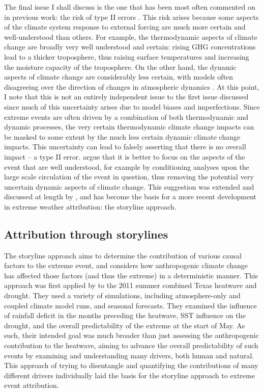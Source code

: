     The final issue I shall discuss is the one that has been most often commented on in previous work: the risk of type II errors \citep{shepherd_common_2016,trenberth_attribution_2015}. This risk arises because some aspects of the climate system response to external forcing are much more certain and well-understood than others. For example, the thermodynamic aspects of climate change are broadly very well understood and certain: rising GHG concentrations lead to a thicker troposphere, thus raising surface temperatures and increasing the moisture capacity of the troposphere. On the other hand, the dynamic aspects of climate change are considerably less certain, with models often disagreeing over the direction of changes in atmospheric dynamics \citep{masato_winter_2013}. At this point, I note that this is not an entirely independent issue to the first issue discussed since much of this uncertainty arises due to model biases and imperfections. Since extreme events are often driven by a combination of both thermodynamic and dynamic processes, the very certain thermodynamic climate change impacts can be masked to some extent by the much less certain dynamic climate change impacts. This uncertainty can lead to falsely asserting that there is no overall impact -- a type II error. \citet{trenberth_attribution_2015} argue that it is better to focus on the aspects of the event that are well understood, for example by conditioning analyses upon the large scale circulation of the event in question, thus removing the potential very uncertain dynamic aspects of climate change. This suggestion was extended and discussed at length by \citet{shepherd_common_2016}, and has become the basis for a more recent development in extreme weather attribution: the storyline approach.

  \subsection{Attribution through storylines}\label{intro:storylines}

    The storyline approach \citep[or `Boulder' approach,][]{otto_attribution_2017} aims to determine the contribution of various causal factors to the extreme event, and considers how anthropogenic climate change has affected those factors (and thus the extreme) in a deterministic manner. This approach was first applied by \citet{hoerling_anatomy_2013} to the 2011 summer combined Texas heatwave and drought. They used a variety of simulations, including atmosphere-only and coupled climate model runs, and seasonal forecasts. They examined the influence of rainfall deficit in the months preceding the heatwave, SST influence on the drought, and the overall predictability of the extreme at the start of May. As such, their intended goal was much broader than just assessing the anthropogenic contribution to the heatwave, aiming to advance the overall predictability of such events by examining and understanding many drivers, both human and natural. This approach of trying to disentangle and quantifying the contributions of many different drivers individually laid the basis for the storyline approach to extreme event attribution.

